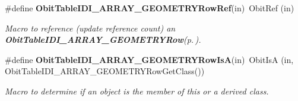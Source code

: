 \begin{CompactItemize}
\#define {\bf Obit\-Table\-IDI\_\-ARRAY\_\-GEOMETRYRow\-Ref}(in)\ Obit\-Ref (in)
\begin{CompactList}\small\item\em Macro to reference (update reference count) an {\bf Obit\-Table\-IDI\_\-ARRAY\_\-GEOMETRYRow}{\rm (p.\,\pageref{structObitTableIDI__ARRAY__GEOMETRYRow})}. \item\end{CompactList}\item 
\#define {\bf Obit\-Table\-IDI\_\-ARRAY\_\-GEOMETRYRow\-Is\-A}(in)\ Obit\-Is\-A (in, Obit\-Table\-IDI\_\-ARRAY\_\-GEOMETRYRow\-Get\-Class())
\begin{CompactList}\small\item\em Macro to determine if an object is the member of this or a derived class. \item\end{CompactList}\end{CompactItemize}
